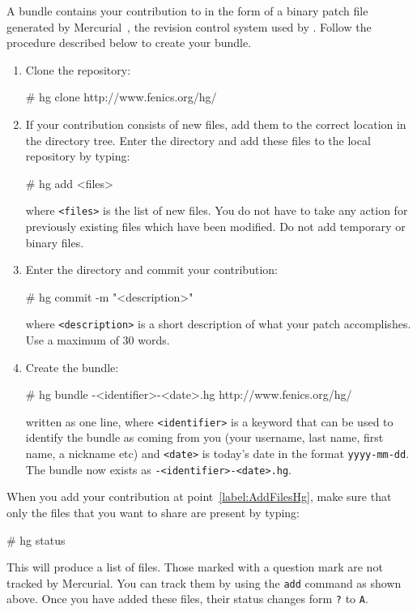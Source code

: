 A bundle contains your contribution to \package{} in the form of a 
binary patch file  generated by Mercurial~\cite{www:Mercurial},  
the revision control system used by \package{}. 
Follow the procedure described below to create your bundle.
\begin{enumerate}
\item
  Clone the \package{} repository:
  \begin{macrocode}
# hg clone http://www.fenics.org/hg/\packagett{}
  \end{macrocode}
\item \label{label:AddFilesHg} If your contribution consists of new files, 
  add them to the 
  correct location in the \package{} directory tree. Enter the \package{}
  directory and add these files to the local repository by typing:
  \begin{macrocode}
# hg add <files>
  \end{macrocode}
  where \texttt{<files>} is the list of new files.
  You do not have to take any action for previously existing files 
  which have been modified. Do not add temporary or binary files. 
\item Enter the \package{} directory and commit your contribution:
  \begin{macrocode}
# hg commit -m "<description>"
  \end{macrocode}
  where \texttt{<description>} is a short description of what 
  your patch accomplishes. Use a maximum of 30 words.
\item Create the bundle:
  \begin{macrocode}
# hg bundle \packagett{}-<identifier>-<date>.hg 
  http://www.fenics.org/hg/\packagett{}
  \end{macrocode}
  written as one line, where \texttt{<identifier>} is a keyword that
  can be used to identify the bundle as coming from you (your username,
  last name, first name, a nickname etc) and \texttt{<date>} is
  today's date in the format \texttt{yyyy-mm-dd}.\\
  The bundle now exists as \texttt{\packagett{}-<identifier>-<date>.hg}.
\end{enumerate}

When you add your contribution at point~\ref{label:AddFilesHg}, 
make sure that only the files 
that you want to share are present by typing:
\begin{macrocode}
# hg status 
\end{macrocode}
This will produce a list of files. Those marked with a question mark 
are not tracked by Mercurial. You can track them by using the
\texttt{add}  command as shown above. Once you have 
added these files, their status changes form  \texttt{?} to \texttt{A}.
  
